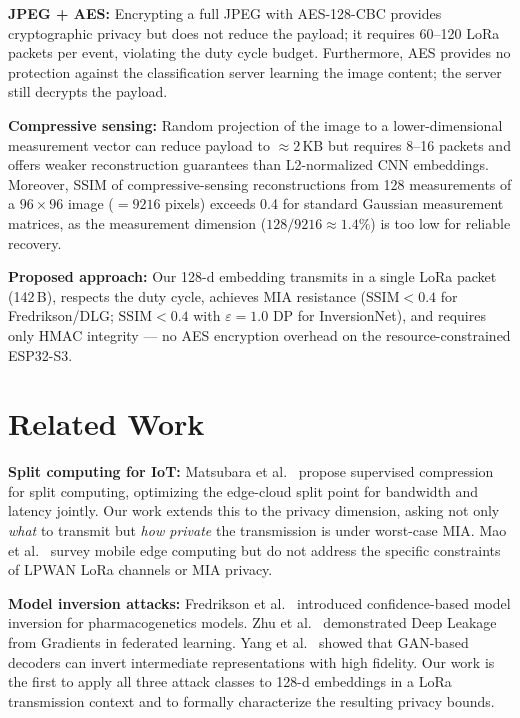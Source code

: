 \documentclass[journal]{IEEEtran}
\newcommand{\ssim}{\mathrm{SSIM}}
\newcommand{\eps}{\varepsilon}
\begin{document}
\textbf{JPEG + AES:}
Encrypting a full JPEG with AES-128-CBC provides cryptographic privacy
but does not reduce the payload; it requires 60--120 LoRa packets per
event, violating the duty cycle budget.
Furthermore, AES provides no protection against the classification server
learning the image content; the server still decrypts the payload.

\textbf{Compressive sensing:}
Random projection of the image to a lower-dimensional measurement
vector can reduce payload to $\approx 2$\,KB but requires 8--16 packets
and offers weaker reconstruction guarantees than L2-normalized CNN
embeddings.
Moreover, SSIM of compressive-sensing reconstructions from 128 measurements
of a $96 \times 96$ image ($= 9216$ pixels) exceeds 0.4 for standard
Gaussian measurement matrices, as the measurement dimension
($128/9216 \approx 1.4\%$) is too low for reliable recovery.

\textbf{Proposed approach:}
Our 128-d embedding transmits in a single LoRa packet (142\,B),
respects the duty cycle, achieves MIA resistance ($\ssim < 0.4$
for Fredrikson/DLG; $\ssim < 0.4$ with $\eps=1.0$ DP for InversionNet),
and requires only HMAC integrity --- no AES encryption overhead on
the resource-constrained ESP32-S3.

\section{Related Work}
\label{sec:related}

\textbf{Split computing for IoT:}
Matsubara et al.~\cite{Matsubara2022} propose supervised compression
for split computing, optimizing the edge-cloud split point for
bandwidth and latency jointly.
Our work extends this to the privacy dimension, asking not only
\emph{what} to transmit but \emph{how private} the transmission is
under worst-case MIA.
Mao et al.~\cite{Mao2022} survey mobile edge computing but do not
address the specific constraints of LPWAN LoRa channels or MIA privacy.

\textbf{Model inversion attacks:}
Fredrikson et al.~\cite{Fredrikson2015} introduced confidence-based
model inversion for pharmacogenetics models.
Zhu et al.~\cite{Zhu2019} demonstrated Deep Leakage from Gradients
in federated learning.
Yang et al.~\cite{Yang2019} showed that GAN-based decoders can
invert intermediate representations with high fidelity.
Our work is the first to apply all three attack classes to
128-d embeddings in a LoRa transmission context and to formally
characterize the resulting privacy bounds.
\end{document}
